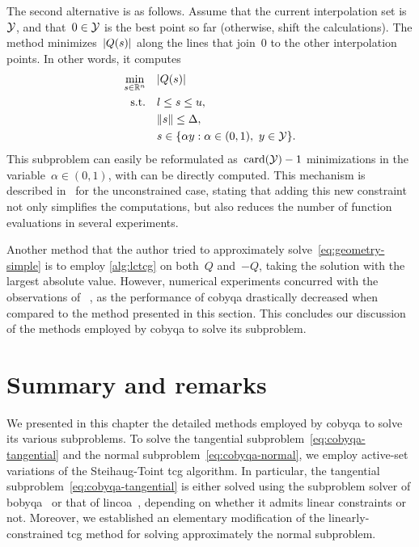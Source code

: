 The second alternative is as follows.
Assume that the current interpolation set is~$\xpt$, and that~$0 \in \xpt$ is the best point so far (otherwise, shift the calculations).
The method minimizes~$\abs{Q(\sstep)}$ along the lines that join~$0$ to the other interpolation points.
In other words, it computes
\begin{align*}
    \min_{\sstep \in \R^n}  & \quad \abs{Q(\sstep)}\\
    \text{s.t.}             & \quad \xl \le \sstep \le \xu,\\
                            & \quad \norm{\sstep} \le \rad,\\
                            & \quad \sstep \in \set{\alpha y : \alpha \in (0, 1), ~ y \in \xpt}.
\end{align*}
This subproblem can easily be reformulated as~$\card(\xpt) - 1$ minimizations in the variable~$\alpha \in (0, 1)$, with can be directly computed.
This mechanism is described in~\cite{Powell_2008} for the unconstrained case, stating that adding this new constraint not only simplifies the computations, but also reduces the number of function evaluations in several experiments.

Another method that the author tried to approximately solve~\cref{eq:geometry-simple} is to employ \cref{alg:lctcg} on both~$Q$ and~$-Q$, taking the solution with the largest absolute value.
However, numerical experiments concurred with the observations of \citeauthor{Powell_2008}~\cite{Powell_2008}, as the performance of \gls{cobyqa} drastically decreased when compared to the method presented in this section.
This concludes our discussion of the methods employed by \gls{cobyqa} to solve its subproblem.

\section{Summary and remarks}

We presented in this chapter the detailed methods employed by \gls{cobyqa} to solve its various subproblems.
To solve the tangential subproblem~\cref{eq:cobyqa-tangential} and the normal subproblem~\cref{eq:cobyqa-normal}, we employ active-set variations of the Steihaug-Toint \gls{tcg} algorithm.
In particular, the tangential subproblem~\cref{eq:cobyqa-tangential} is either solved using the subproblem solver of \gls{bobyqa}~\cite{Powell_2009} or that of \gls{lincoa}~\cite{Powell_2015}, depending on whether it admits linear constraints or not.
Moreover, we established an elementary modification of the linearly-constrained \gls{tcg} method for solving approximately the normal subproblem.

